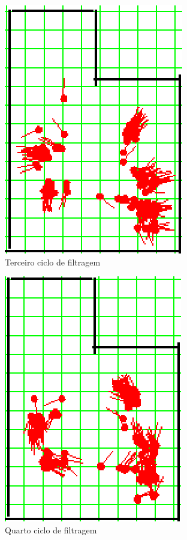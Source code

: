 \begin{figure}[H]
  \centering
  \includegraphics[scale=1]{figuras/cen1_ex2/4.eps}
  \caption[Terceiro Ciclo de Filtragem]{Terceiro ciclo de filtragem}
  \label{img:cen1_ex2_4}
\end{figure}

\begin{figure}[H]
  \centering
  \includegraphics[scale=1]{figuras/cen1_ex2/5.eps}
  \caption[Quarto Ciclo de Filtragem]{Quarto ciclo de filtragem}
  \label{img:cen1_ex2_5}
\end{figure}

